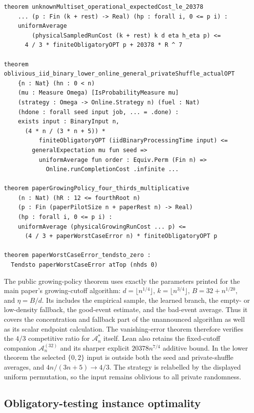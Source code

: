 \begin{lstlisting}[style=lean]
theorem unknownMultiset_operational_expectedCost_le_20378
    ... (p : Fin (k + rest) -> Real) (hp : forall i, 0 <= p i) :
    uniformAverage
        (physicalSampledRunCost (k + rest) k d eta h_eta p) <=
      4 / 3 * finiteObligatoryOPT p + 20378 * R ^ 7

theorem oblivious_iid_binary_lower_online_general_privateShuffle_actualOPT
    {n : Nat} (hn : 0 < n)
    (mu : Measure Omega) [IsProbabilityMeasure mu]
    (strategy : Omega -> Online.Strategy n) (fuel : Nat)
    (hdone : forall seed input job, ... = .done) :
    exists input : BinaryInput n,
      (4 * n / (3 * n + 5)) *
          finiteObligatoryOPT (iidBinaryProcessingTime input) <=
        generalExpectation mu fun seed =>
          uniformAverage fun order : Equiv.Perm (Fin n) =>
            Online.runCompletionCost .infinite ...

theorem paperGrowingPolicy_four_thirds_multiplicative
    (n : Nat) (hR : 12 <= fourthRoot n)
    (p : Fin (paperPilotSize n + paperRest n) -> Real)
    (hp : forall i, 0 <= p i) :
    uniformAverage (physicalGrowingRunCost ... p) <=
      (4 / 3 + paperWorstCaseError n) * finiteObligatoryOPT p

theorem paperWorstCaseError_tendsto_zero :
  Tendsto paperWorstCaseError atTop (nhds 0)
\end{lstlisting}

The public growing-policy theorem uses exactly the parameters printed for the
main paper's growing-cutoff algorithm: $d=\lfloor n^{1/4}\rfloor$,
$k=\lfloor n^{3/4}\rfloor$, $B=32+n^{1/20}$, and $\eta=B/d$.
Its  includes the empirical sample, the learned
branch, the empty- or low-density fallback, the good-event estimate, and the
bad-event average.  Thus it covers the concentration and fallback part of the
unannounced algorithm as well as its scalar endpoint calculation.
The vanishing-error theorem therefore verifies the $4/3$ competitive ratio
for $\mathcal A_n^*$ itself.  Lean also retains the fixed-cutoff companion
$\mathcal A_n^{(32)}$ and its sharper explicit $20378n^{7/4}$ additive
bound.  In the lower theorem the selected
$\{0,2\}$ input is outside both the seed and private-shuffle averages, and
$4n/(3n+5)\to4/3$.  The strategy is relabelled by the displayed uniform
permutation, so the input remains oblivious to all private randomness.

\subsection{Obligatory-testing instance optimality}


